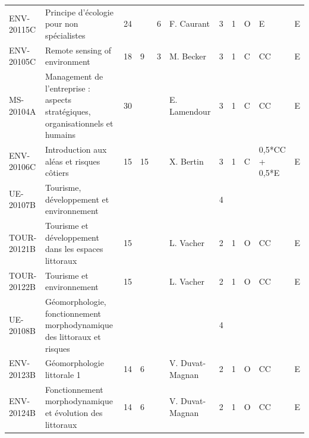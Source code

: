 \documentclass[a4paper,11pt]{article}
\begin{document}
{{\begin{tabular}{lllllllllll}
ENV-20115C                         & Principe d'écologie pour non spécialistes                                      & 24 &    & 6  & F. Caurant                        & 3    & 1    & O           & E              & E         \\
ENV-20105C                         & \cellcolor[HTML]{FD6864}Remote sensing of environment                          & 18 & 9  & 3  & \cellcolor[HTML]{FD6864}M. Becker & 3    & 1    & C           & CC             & E         \\
MS-20104A                          & Management de l'entreprise : aspects stratégiques, organisationnels et humains & 30 &    &    & E. Lamendour                      & 3    & 1    & C           & CC             & E         \\
ENV-20106C                         & Introduction aux aléas et risques côtiers                                      & 15 & 15 &    & X. Bertin                         & 3    & 1    & C           & 0,5*CC + 0,5*E & E         \\
\rowcolor[HTML]{EFEFEF} 
UE-20107B                          & Tourisme, développement et environnement                                       &    &    &    &                                   & 4    &      &             &                &           \\
TOUR-20121B                        & Tourisme et développement dans les espaces littoraux                           & 15 &    &    & L. Vacher                         & 2    & 1    & O           & CC             & E         \\
TOUR-20122B                        & Tourisme et environnement                                                      & 15 &    &    & L. Vacher                         & 2    & 1    & O           & CC             & E         \\
\rowcolor[HTML]{EFEFEF} 
UE-20108B                          & Géomorphologie, fonctionnement morphodynamique des littoraux et risques        &    &    &    &                                   & 4    &      &             &                &           \\
ENV-20123B                         & Géomorphologie littorale 1                                                     & 14 & 6  &    & V. Duvat-Magnan                   & 2    & 1    & O           & CC             & E         \\
ENV-20124B                         & Fonctionnement morphodynamique et évolution des littoraux                      & 14 & 6  &    & V. Duvat-Magnan                   & 2    & 1    & O           & CC             & E         \\

\end{tabular}}}
\end{document}
